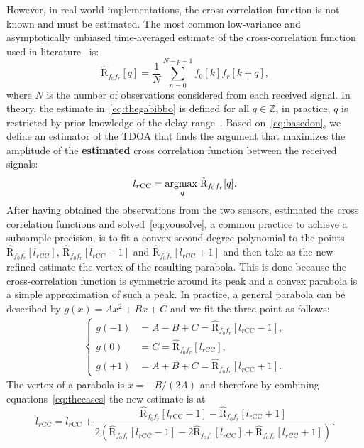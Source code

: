 \noindent
However, in real-world implementations, the cross-correlation function is not known and must be estimated. The most common low-variance and asymptotically unbiased time-averaged estimate of the cross-correlation function used in literature~\cite{benesty2008microphone} is:
\begin{equation}
\hat{\mathrm{R}}_{f_0f_r}[q]=\frac{1}{N} \sum_{n=0}^{N-p-1} f_0[k]f_r[k+q],
\label{eq:thegabibbo}
\end{equation}
where \(N\) is the number of observations considered from each received signal. In theory, the estimate in~\eqref{eq:thegabibbo} is defined for all \(q\in\mathbb{Z}\), in practice, \(q\) is restricted by prior knowledge of the delay range~\cite{Discrete-time-techniques}. Based on~\eqref{eq:basedon}, we define an estimator of the TDOA that finds the argument that maximizes the amplitude of the \textbf{estimated} cross correlation function between the received signals:
\begin{equation}
l_{r\text{CC}}=\underset{q}{\operatorname*{argmax\;}} \hat{\mathrm{R}}_{f_0f_r}[q].
\label{eq:yousolve}
\end{equation}
After having obtained the observations from the two sensors, estimated the cross correlation functions and solved~\eqref{eq:yousolve}, a common practice to achieve a subsample precision, is to fit a convex second degree polynomial to the points \(\hat{\mathrm{R}}_{f_0f_r}[l_{r\text{CC}}]\), \(\hat{\mathrm{R}}_{f_0f_r}[l_{r\text{CC}}-1]\) and \(\hat{\mathrm{R}}_{f_0f_r}[l_{r\text{CC}}+1]\) and then take as the new refined estimate the vertex of the resulting parabola. This is done because the cross-correlation function is symmetric around its peak and a convex parabola is a simple approximation of such a peak. In practice, a general parabola can be described by \(g(x)=Ax^2+Bx+C\) and we fit the three point as follows:
\begin{align}
\begin{cases}
g(-1) & =A-B+C=\hat{\mathrm{R}}_{f_0f_r}[l_{r\text{CC}}-1], \\
g(0) & = C =\hat{\mathrm{R}}_{f_0f_r}[l_{r\text{CC}}], \\
g(+1) & =A+B+C=\hat{\mathrm{R}}_{f_0f_r}[l_{r\text{CC}}+1].
\end{cases}
\label{eq:thecases}
\end{align}
The vertex of a parabola is \(x=-B/(2A)\) and therefore by combining equations~\eqref{eq:thecases} the new estimate is at
\begin{equation}
\hat{l}_{r\text{CC}}={l}_{r\text{CC}}+\frac{\hat{\mathrm{R}}_{f_0f_r}[l_{r\text{CC}}-1]-\hat{\mathrm{R}}_{f_0f_r}[l_{r\text{CC}}+1]}{2\left(\hat{\mathrm{R}}_{f_0f_r}[l_{r\text{CC}}-1]-2 \hat{\mathrm{R}}_{f_0f_r}[l_{r\text{CC}}]+\hat{\mathrm{R}}_{f_0f_r}[l_{r\text{CC}}+1]\right)}.
\end{equation}

